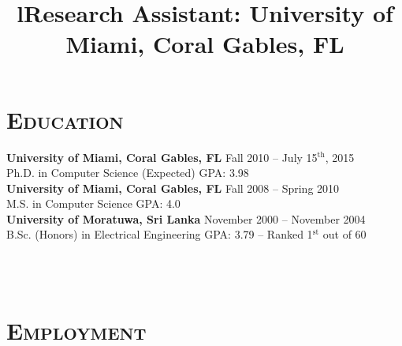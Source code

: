\begin{resume}



\vspace{-5mm}
\section{\textsc{Education}}

\textbf{University of Miami, Coral Gables, FL} \hfill Fall 2010 -- July 15$^{\mbox{th}}$, 2015 \\
Ph.D. in Computer Science (Expected) \hfill GPA: 3.98 \\
\newline
\textbf{University of Miami, Coral Gables, FL} \hfill Fall 2008 -- Spring 2010 \\
M.S. in Computer Science \hfill GPA: 4.0 \\
\newline
\textbf{University of Moratuwa, Sri Lanka} \hfill November 2000 -- November 2004 \\ 
B.Sc. (Honors) in Electrical Engineering \hfill GPA: 3.79 -- Ranked 1$^{\mbox{st}}$ out of 60




\begin{formatb}
  \title{l}\\
  \body\\
\end{formatb}

\vspace{-2mm}
\section{\textsc{Employment}}

\title{\textbf{Research Assistant: University of Miami, Coral Gables, FL}}



\end{resume}
